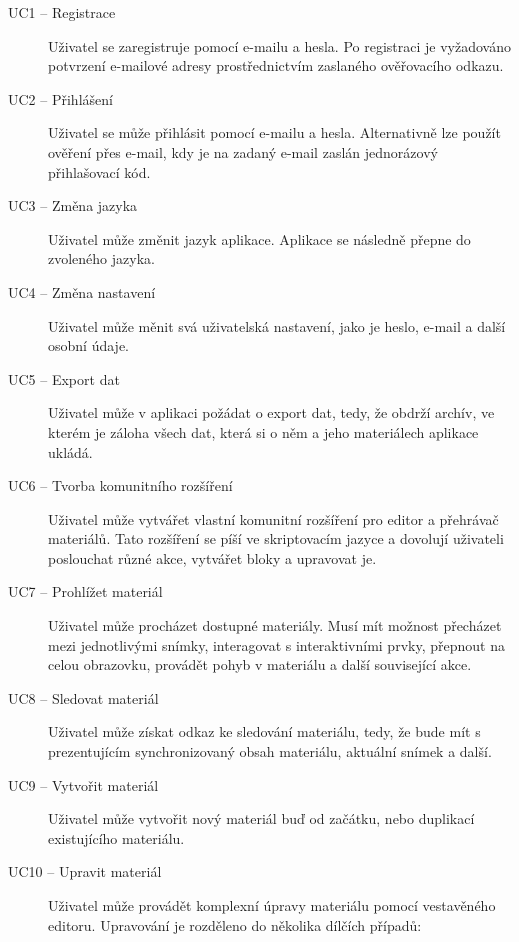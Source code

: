 \begin{description}
    \item[UC1 -- Registrace]
    Uživatel se zaregistruje pomocí e-mailu a hesla. Po registraci je vyžadováno potvrzení e-mailové adresy prostřednictvím zaslaného ověřovacího odkazu.

    \item[UC2 -- Přihlášení]
    Uživatel se může přihlásit pomocí e-mailu a hesla. Alternativně lze použít ověření přes e-mail, kdy je na zadaný e-mail zaslán jednorázový přihlašovací kód.
    
    \item[UC3 -- Změna jazyka]
    Uživatel může změnit jazyk aplikace. Aplikace se následně přepne do zvoleného jazyka. 

    \item[UC4 -- Změna nastavení]
    Uživatel může měnit svá uživatelská nastavení, jako je heslo, e-mail a další osobní údaje.
    
    \item[UC5 -- Export dat]
    Uživatel může v aplikaci požádat o export dat, tedy, že obdrží archív, ve kterém je záloha všech dat, která si o něm a jeho materiálech aplikace ukládá.
    
    
    \item[UC6 -- Tvorba komunitního rozšíření]
    Uživatel může vytvářet vlastní komunitní rozšíření pro editor a přehrávač materiálů. Tato rozšíření se píší ve skriptovacím jazyce a dovolují uživateli poslouchat různé akce, vytvářet bloky a upravovat je.
    
    \item[UC7 -- Prohlížet materiál]
    Uživatel může procházet dostupné materiály. Musí mít možnost přecházet mezi jednotlivými snímky, interagovat s interaktivními prvky, přepnout na celou obrazovku, provádět pohyb v materiálu a další související akce.
    
    \item[UC8 -- Sledovat materiál]
    Uživatel může získat odkaz ke sledování materiálu, tedy, že bude mít s prezentujícím synchronizovaný obsah materiálu, aktuální snímek a další.
    
    \item[UC9 -- Vytvořit materiál]
    Uživatel může vytvořit nový materiál buď od začátku, nebo duplikací existujícího materiálu.
    
    \item[UC10 -- Upravit materiál]
    Uživatel může provádět komplexní úpravy materiálu pomocí vestavěného editoru. Upravování je rozděleno do několika dílčích případů:
        

\end{description}
